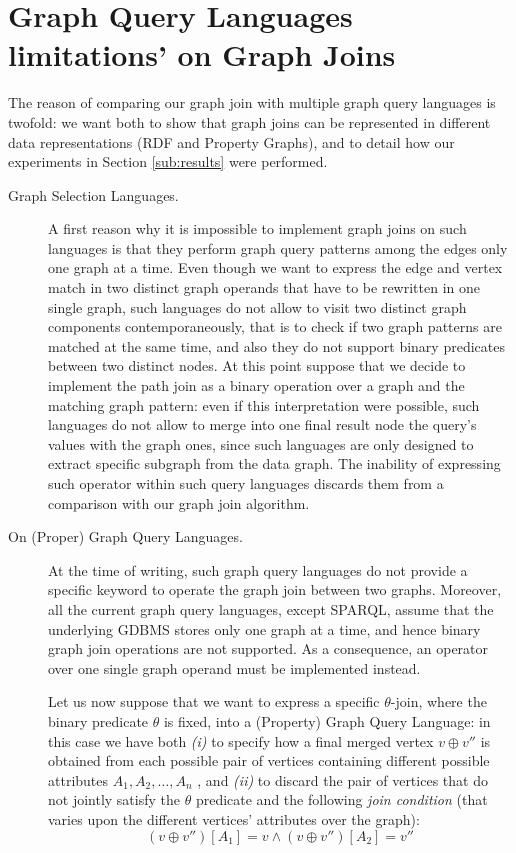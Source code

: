 \section{Graph Query Languages limitations' on Graph Joins}
The reason of comparing our graph join with multiple graph query languages is twofold: we want both to show that graph joins can be represented in different data representations (RDF and Property Graphs), and
to detail how our experiments in Section \ref{sub:results} were performed.

\begin{description}
	\item[Graph Selection Languages.]
	A first reason why it is impossible to implement graph joins on such languages is that they perform graph query patterns among the edges
	only one graph at a time. Even though we want to express the edge and vertex match in two distinct
	graph operands that have to be rewritten in one single graph, such languages
	do not allow to visit two distinct graph components contemporaneously, that is to check if two
	graph patterns are matched at the same time, and also they do not support binary predicates
	between two distinct nodes. At this point suppose that we decide to implement
	the path join as a binary operation over a graph and the matching graph pattern: even if this interpretation were possible,
	such languages do not allow to merge into one final result node the query's values with the
	graph ones, since such languages are only designed to extract specific subgraph from the data graph. 
	The inability of expressing such operator within such query languages discards them from a comparison with our graph join algorithm.

	\item[On (Proper) Graph Query Languages.] At the time of writing, such graph query languages do not provide
	a specific keyword to operate the graph join between two graphs. Moreover, all the current graph
	query languages, except SPARQL, assume that the underlying GDBMS stores only one graph at a time, and hence
	binary graph join operations are not supported. As a consequence, an operator over one single graph operand must be implemented instead.

	Let us now suppose that we want to express a specific $\theta$-join, where the binary predicate $\theta$
	is fixed, into a (Property) Graph Query Language:
	in this case we have both \textit{(i)} to specify how a final merged vertex $v\oplus v''$ is obtained from each
	possible pair of vertices containing different possible attributes $A_1,A_2,\dots,A_n$ , and \textit{(ii)} to discard
	the pair of vertices that do not jointly satisfy  the
	$\theta$ predicate and the following \textit{join condition} (that varies upon the different vertices'
	attributes over the graph):
	\[(v\oplus v'')[A_1]=v\wedge  (v\oplus v'')[A_2]=v''\]


\end{description}
